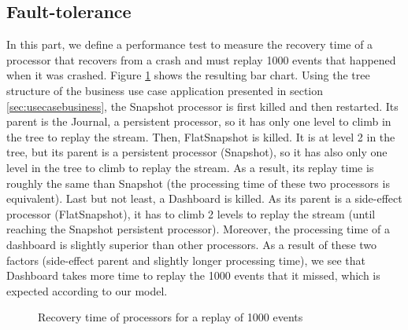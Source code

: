 \subsection{Fault-tolerance}

In this part, we define a performance test to measure the recovery time of a processor that recovers from a crash and must replay 1000 events that happened when it was crashed. Figure \ref{fig:barchart} shows the resulting bar chart.
Using the tree structure of the business use case application presented in section \ref{sec:usecasebusiness}, the Snapshot processor is first killed and then restarted. Its parent is the Journal, a persistent processor, so it has only one level to climb in the tree to replay the stream. Then, FlatSnapshot is killed. It is at level 2 in the tree, but its parent is a persistent processor (Snapshot), so it has also only one level in the tree to climb to replay the stream. As a result, its replay time is roughly the same than Snapshot (the processing time of these two processors is equivalent). Last but not least, a Dashboard is killed. As its parent is a side-effect processor (FlatSnapshot), it has to climb 2 levels to replay the stream (until reaching the Snapshot persistent processor). Moreover, the processing time of a dashboard is slightly superior than other processors. As a result of these two factors (side-effect parent and slightly longer processing time), we see that Dashboard takes more time to replay the 1000 events that it missed, which is expected according to our model.

\begin{figure}[h]
  \begin{center} 
    \caption{Recovery time of processors for a replay of 1000 events}
    \label{fig:barchart}
  \end{center}
\end{figure}



